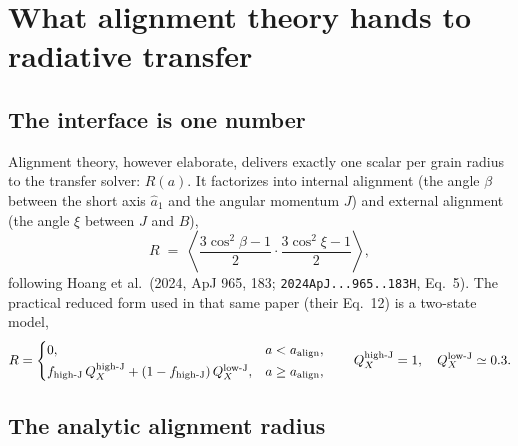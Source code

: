 \documentclass{my_memo}
\newcommand{\code}[1]{\texttt{#1}}
\newcommand{\aalign}{\ensuremath{a_{\rm align}}}
\newcommand{\fhighJ}{\ensuremath{f_{\rm high\text{-}J}}}
\begin{document}
\section{What alignment theory hands to radiative transfer}
\label{sec:alignment}

\subsection{The interface is one number}

Alignment theory, however elaborate, delivers exactly one scalar per
grain radius to the transfer solver: $R(a)$. It factorizes into internal
alignment (the angle $\beta$ between the short axis $\hat a_1$ and the
angular momentum $J$) and external alignment (the angle $\xi$ between $J$
and $B$),
\begin{equation}
  R \;=\; \left\langle
    \frac{3\cos^2\beta - 1}{2}\cdot\frac{3\cos^2\xi - 1}{2}
  \right\rangle,
  \label{eq:Rprod}
\end{equation}
following Hoang et al.\ (2024, ApJ 965, 183; \code{2024ApJ...965..183H},
Eq.~5). The practical reduced form used in that same paper (their Eq.~12)
is a two-state model,
\begin{equation}
  R = \begin{cases}
    0, & a < \aalign, \\[2pt]
    \fhighJ\,Q_X^{\rm high\text{-}J}
      + (1-\fhighJ)\,Q_X^{\rm low\text{-}J}, & a \geq \aalign,
  \end{cases}
  \qquad
  Q_X^{\rm high\text{-}J} = 1,\quad Q_X^{\rm low\text{-}J} \simeq 0.3.
  \label{eq:Rreduced}
\end{equation}

\subsection{The analytic alignment radius}
\end{document}
